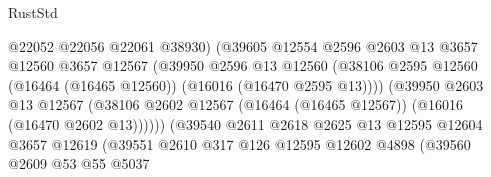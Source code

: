 \begin{lexlean}{RustStd}
\begin{coremodule}
                                          @22052
                                          @22056
                                          @22061
                                          @38930)
                                        (@39605
                                          @12554
                                          @2596
                                          @2603
                                          @13
                                          @3657
                                          @12560
                                          @3657
                                          @12567
                                          (@39950
                                            @2596
                                            @13
                                            @12560
                                            (@38106
                                              @2595
                                              @12560
                                              (@16464 (@16465 @12560))
                                              (@16016 (@16470 @2595 @13))))
                                          (@39950
                                            @2603
                                            @13
                                            @12567
                                            (@38106
                                              @2602
                                              @12567
                                              (@16464 (@16465 @12567))
                                              (@16016 (@16470 @2602 @13))))))
                                      (@39540
                                        @2611
                                        @2618
                                        @2625
                                        @13
                                        @12595
                                        @12604
                                        @3657
                                        @12619
                                        (@39551
                                          @2610
                                          @317
                                          @126
                                          @12595
                                          @12602
                                          @4898
                                          (@39560
                                            @2609
                                            @53
                                            @55
                                            @5037

\end{coremodule}
\end{lexlean}
